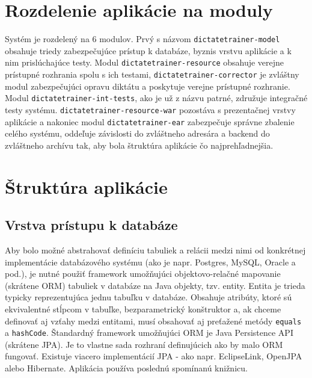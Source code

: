 \documentclass[12pt,oneside]{fithesis2}
\begin{document}
	   	\section{Rozdelenie aplikácie na moduly}
      	\par Systém je rozdelený na 6 modulov. Prvý s názvom \texttt{dictatetrainer-model} obsahuje triedy zabezpečujúce prístup k databáze, byznis vrstvu aplikácie a k nim prislúchajúce testy. Modul \texttt{dictatetrainer-resource} obsahuje verejne prístupné rozhrania spolu s ich testami, \texttt{dictatetrainer-corrector} je zvláštny modul zabezpečujúci opravu diktátu a poskytuje verejne prístupné rozhranie. Modul \texttt{dictatetrainer-int-tests}, ako je už z názvu patrné, združuje integračné testy systému. \texttt{dictatetrainer-resource-war} pozostáva s prezentačnej vrstvy aplikácie a nakoniec modul \texttt{dictatetrainer-ear} zabezpečuje správne zbalenie celého systému, oddeľuje závislosti do zvláštneho adresára a backend do zvláštneho archívu tak, aby bola štruktúra aplikácie čo najprehľadnejšia.
    \section{Štruktúra aplikácie}
          \subsection{Vrstva prístupu k databáze}
      
      \par Aby bolo možné abstrahovať definíciu tabuliek a relácii medzi nimi od konkrétnej implementácie databázového systému (ako je napr. Postgres, MySQL, Oracle a pod.), je nutné použiť framework umožňujúci objektovo-relačné mapovanie (skrátene ORM) tabuliek v databáze na Java objekty, tzv. entity. Entita je trieda typicky reprezentujúca jednu tabuľku v databáze. Obsahuje atribúty, ktoré sú ekvivalentné stĺpcom v tabuľke, bezparametrický konštruktor a, ak chceme definovať aj vzťahy medzi entitami, musí obsahovať aj preťažené metódy \texttt{equals} a \texttt{hashCode}. Štandardný framework umožňujúci ORM je Java Persistence API (skrátene JPA). Je to vlastne sada rozhraní definujúcich ako by malo ORM fungovať. Existuje viacero implementácií JPA - ako napr. EclipseLink, OpenJPA alebo Hibernate. Aplikácia používa poslednú spomínanú knižnicu.
      
\end{document}
